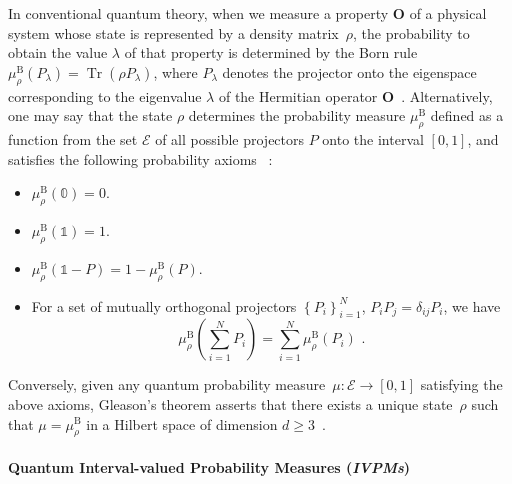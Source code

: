 \documentclass[english,reprint, aps, prl,superscriptaddress, showpacs,
showkeys, longbibliography, amsmath, amssymb]{revtex4-1}
\theoremstyle{plain}
\theoremstyle{definition}
\newcommand{\events}{\ensuremath{\mathcal{E}}}
\newcommand{\Tr}{\mathop{\mathrm{Tr}}\nolimits}
\begin{document}
In conventional quantum theory, when we measure a property $\mathbf{O}$
of a physical system whose state is represented by a density matrix~$\rho$,
the probability to obtain the value $\lambda$ of that property is determined by the
Born rule $\mu_{\rho}^{\mathrm{B}}\left(P_{\lambda}\right)=\Tr\left(\rho P_{\lambda}\right)$,
where $P_{\lambda}$ denotes the projector onto the eigenspace corresponding
to the eigenvalue $\lambda$ of the Hermitian operator
$\mathbf{O}$~\cite{Born1983,peres1995quantum,544199,Jaeger2007}. 
Alternatively, one may say that the state $\rho$ determines the 
probability measure $\mu_{\rho}^{\mathrm{B}}$ defined as a
function from the set $\events$ of all possible projectors $P$ onto the interval 
$[0,1]$, and satisfies the following probability axioms~
\cite{10.2307/2308516,gleason1957,Redhead1987-REDINA,Maassen2010}: 
\begin{itemize}
\item $\mu_{\rho}^{\mathrm{B}}(\mathbb{0})=0$. 
\item $\mu_{\rho}^{\mathrm{B}}(\mathbb{1})=1$. 
\item $\mu_{\rho}^{\mathrm{B}}\left(\mathbb{1}-P\right)=
1-\mu_{\rho}^{\mathrm{B}}\left(P\right)$. 
\item For a set of mutually orthogonal projectors $\left\{ P_{i}\right\} _{i=1}^{N}$,
$P_iP_j=\delta_{ij}P_i$,
we have 
\begin{equation}
\mu_{\rho}^{\mathrm{B}}\left(\sum_{i=1}^{N}P_{i}\right)=
\sum_{i=1}^{N}\mu_{\rho}^{\mathrm{B}}\left(P_{i}\right)
\textrm{ .}\label{eq:QuantumProbability-Addition}
\end{equation}
\end{itemize}
Conversely, given any quantum probability measure~$\mu:\events\rightarrow[0,1]$
satisfying the above axioms, Gleason's theorem asserts that there
exists a unique state~$\rho$ such that $\mu=\mu_{\rho}^{\mathrm{B}}$
in a Hilbert space of dimension $d\geq3$~\cite{gleason1957,Redhead1987-REDINA,peres1995quantum}.

\paragraph{Quantum Interval-valued Probability Measures (\emph{IVPMs})}
\end{document}
